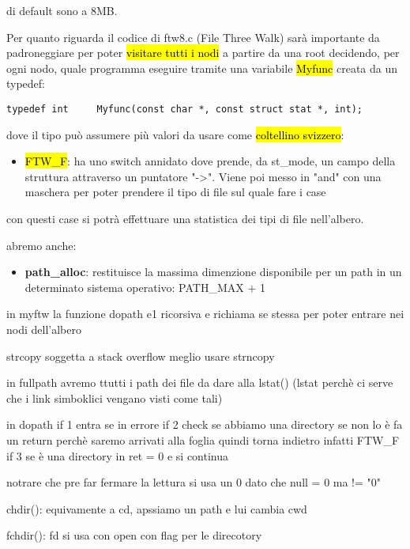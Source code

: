 di default sono a 8MB.

Per quanto riguarda il codice di ftw8.c (File Three Walk) sarà importante da padroneggiare per poter \hl{visitare tutti i nodi} a partire da una root decidendo, per ogni nodo, quale programma eseguire tramite una variabile \hl{Myfunc} creata da un typedef:

\begin{lstlisting}
typedef int     Myfunc(const char *, const struct stat *, int);
\end{lstlisting}

dove il tipo può assumere più valori da usare come \hl{coltellino svizzero}: 

\begin{itemize}
	\item \hl{FTW\_F}: ha uno switch annidato dove prende, da st\_mode, un campo della struttura attraverso un puntatore "->". Viene poi messo in "and" con una maschera per poter prendere il tipo di file sul quale fare i case
\end{itemize}

con questi case si potrà effettuare una statistica dei tipi di file nell'albero.

abremo anche:

\begin{itemize}
	\item \textbf{path\_alloc}: restituisce la massima dimenzione disponibile per un path in un determinato sistema operativo: PATH\_MAX + 1
\end{itemize}

in myftw la funzione dopath e1 ricorsiva e richiama se stessa per poter entrare nei nodi dell'albero

strcopy soggetta a stack overflow meglio usare strncopy

in fullpath avremo ttutti i path dei file da dare alla lstat() (lstat perchè ci serve che i link simboklici vengano visti come tali)

in dopath if 1 entra se in errore if 2 check se abbiamo una directory se non lo è fa un return perchè saremo arrivati alla foglia quindi torna indietro infatti FTW\_F if 3 se è una directory in ret = 0 e si continua 

notrare che pre far fermare la lettura si usa un 0 dato che null = 0 ma != "0"




chdir():
equivamente a cd, apssiamo un path e lui cambia cwd

fchdir():
fd si usa con open con flag per le direcotory

